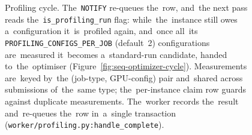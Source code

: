 \begin{figure}[H]
\centering
\footnotesize
\setlength{\unitlength}{0.7cm}
\caption{Profiling cycle.  The~\texttt{NOTIFY} re-queues the~row, and~the
next pass reads the~\texttt{is\_profiling\_run} flag: while~the~instance
still owes a~configuration it~is~profiled again, and~once all~its
\texttt{PROFILING\_CONFIGS\_PER\_JOB} (default~2) configurations are~measured
it~becomes a~standard-run candidate, handed to~the~optimiser
(Figure~\ref{fig:seq-optimizer-cycle}).  Measurements are~keyed by~the
(job-type, GPU-config) pair and~shared across submissions of~the~same type;
the~per-instance claim row guards against duplicate measurements.  The~worker
records the~result and~re-queues the~row in~a~single transaction
(\texttt{worker/profiling.py:handle\_complete}).}
\label{fig:seq-profiling-loop}
\end{figure}

